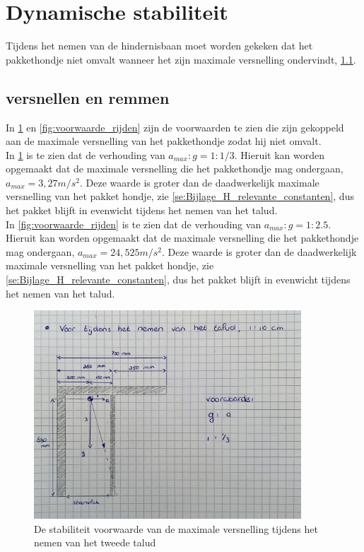\section{Dynamische stabiliteit}
\label{se:Bijlage_H_Dynamische_stabiliteit}
Tijdens het nemen van de hindernisbaan moet worden gekeken dat het pakkethondje niet omvalt wanneer het zijn maximale versnelling ondervindt, \cref{versnellen_en_remmen}.

\subsection{versnellen en remmen}
\label{versnellen_en_remmen}
In \cref{fig:voorwaarde_talud_nemen} en \cref{fig:voorwaarde_rijden} zijn de voorwaarden te zien die zijn gekoppeld aan de maximale versnelling van het pakkethondje zodat hij niet omvalt.\\
In \cref{fig:voorwaarde_talud_nemen} is te zien dat de verhouding van $a_{max} : g = 1 : 1/3$. Hieruit kan worden opgemaakt dat de maximale versnelling die het pakkethondje mag ondergaan, $a_{max} = 3,27 m/s^2$. Deze waarde is groter dan de daadwerkelijk maximale versnelling van het pakket hondje, zie \cref{se:Bijlage_H_relevante_constanten}, dus het pakket blijft in evenwicht tijdens het nemen van het talud.\\
In \cref{fig:voorwaarde_rijden} is te zien dat de verhouding van $a_{max} : g = 1 : 2.5$. Hieruit kan worden opgemaakt dat de maximale versnelling die het pakkethondje mag ondergaan, $a_{max} = 24,525 m/s^2$. Deze waarde is groter dan de daadwerkelijk maximale versnelling van het pakket hondje, zie \cref{se:Bijlage_H_relevante_constanten}, dus het pakket blijft in evenwicht tijdens het nemen van het talud.\\


\begin{figure}[H]
    \centering
    \includegraphics[width = 100mm]{06_Bijlage_H/Dynamische stabiliteit/stabiliteit_talud_nemen.jpg}
    \caption{De stabiliteit voorwaarde van de maximale versnelling tijdens het nemen van het tweede talud}
    \label{fig:voorwaarde_talud_nemen}
\end{figure}

